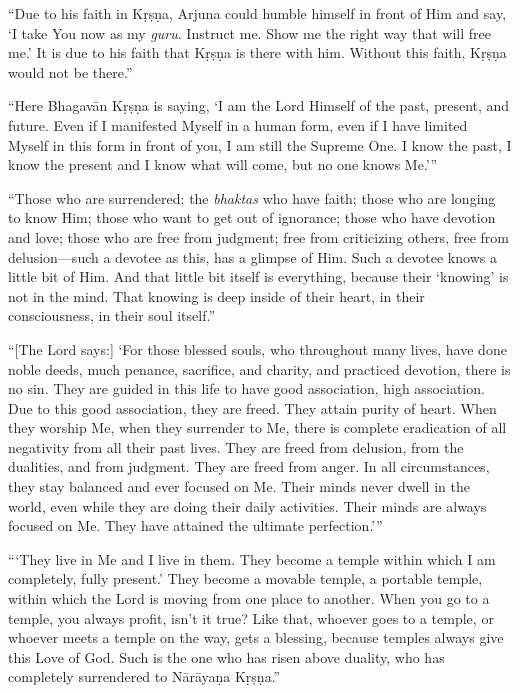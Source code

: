 \enquote{Due to his faith in Kṛṣṇa, Arjuna could humble himself in front of Him and say, \enquote{I take You now as my \textit{guru}. Instruct me. Show me the right way that will free me.} It is due to his faith that Kṛṣṇa is there with him. Without this faith, Kṛṣṇa would not be there.}

\enquote{Here Bhagavān Kṛṣṇa is saying, \enquote{I am the Lord Himself of the past, present, and future. Even if I manifested Myself in a human form, even if I have limited Myself in this form in front of you, I am still the Supreme One. I know the past, I know the present and I know what will come, but no one knows Me.}}

\enquote{Those who are surrendered; the \textit{bhaktas} who have faith; those who are longing to know Him; those who want to get out of ignorance; those who have devotion and love; those who are free from judgment; free from criticizing others, free from delusion---such a devotee as this, has a glimpse of Him. Such a devotee knows a little bit of Him. And that little bit itself is everything, because their \enquote{knowing} is not in the mind. That knowing is deep inside of their heart, in their consciousness, in their soul itself.}

\enquote{[The Lord says:] \enquote{For those blessed souls, who throughout many lives, have done noble deeds, much penance, sacrifice, and charity, and practiced devotion, there is no sin. They are guided in this life to have good association, high association. Due to this good association, they are freed. They attain purity of heart. When they worship Me, when they surrender to Me, there is complete eradication of all negativity from all their past lives. They are freed from delusion, from the dualities, and from judgment. They are freed from anger. In all circumstances, they stay balanced and ever focused on Me. Their minds never dwell in the world, even while they are doing their daily activities. Their minds are always focused on Me. They have attained the ultimate perfection.}}

\enquote{\enquote{They live in Me and I live in them. They become a temple within which I am completely, fully present.} They become a movable temple, a portable temple, within which the Lord is moving from one place to another. When you go to a temple, you always profit, isn’t it true? Like that, whoever goes to a temple, or whoever meets a temple on the way, gets a blessing, because temples always give this Love of God. Such is the one who has risen above duality, who has completely surrendered to Nārāyaṇa Kṛṣṇa.}
